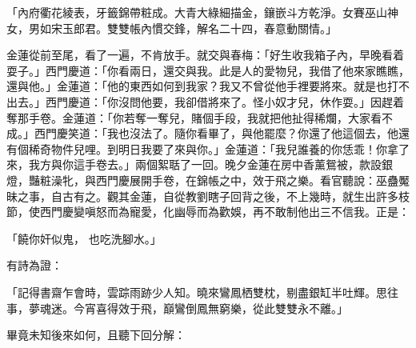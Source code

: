 「內府衢花綾表，牙籤錦帶粧成。大青大綠細描金，鑲嵌斗方乾淨。女賽巫山神女，男如宋玉郎君。雙雙帳內慣交鋒，解名二十四，春意動關情。」

金蓮從前至尾，看了一遍，不肯放手。就交與春梅：「好生收我箱子內，早晚看着耍子。」西門慶道：「你看兩日，還交與我。此是人的愛物兒，我借了他來家瞧瞧，還與他。」金蓮道：「他的東西如何到我家？我又不曾從他手裡要將來。就是也打不出去。」西門慶道：「你沒問他要，我卻借將來了。怪小奴才兒，休作耍。」因趕着奪那手卷。金蓮道：「你若奪一奪兒，賭個手段，我就把他扯得稀爛，大家看不成。」西門慶笑道：「我也沒法了。隨你看畢了，與他罷麼？你還了他這個去，他還有個稀奇物件兒哩。到明日我要了來與你。」金蓮道：「我兒誰養的你恁乖！你拿了來，我方與你這手卷去。」兩個絮聒了一回。晚夕金蓮在房中香薰鴛被，款設銀燈，豔粧澡牝，與西門慶展開手卷，在錦帳之中，效于飛之樂。看官聽說：巫蠱魘昧之事，自古有之。觀其金蓮，自從教劉瞎子回背之後，不上幾時，就生出許多枝節，使西門慶變嗔怒而為寵愛，化幽辱而為歡娛，再不敢制他出三不信我。正是：

「饒你奸似鬼，  也吃洗腳水。」

有詩為證：

「記得書齋乍會時，雲踪雨跡少人知。曉來鸞鳳栖雙枕，剔盡銀缸半吐輝。思往事，夢魂迷。今宵喜得效于飛，巔鸞倒鳳無窮樂，從此雙雙永不離。」

畢竟未知後來如何，且聽下回分解：
